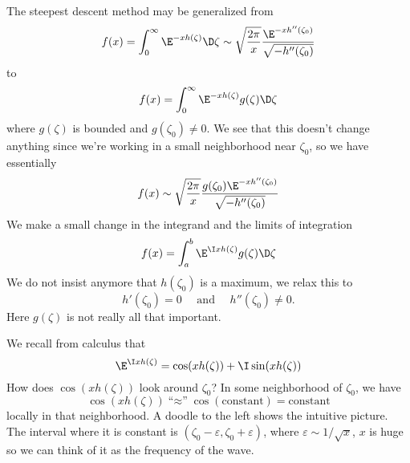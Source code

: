 The steepest descent method may be generalized from
\begin{equation}
f(x)=\int^{\infty}_{0}\E^{-xh(\zeta)}\D\zeta\asymptote\sqrt{\frac{2\pi}{x}}\frac{\E^{-xh''(\zeta_{0})}}{\sqrt{-h''(\zeta_{0})}}
\end{equation}
to 
\begin{equation}
f(x)=\int^{\infty}_{0}\E^{-xh(\zeta)}g(\zeta)\D\zeta
\end{equation}
where $g(\zeta)$ is bounded and $g(\zeta_{0})\not=0$.
We see that this doesn't change anything since we're working in a
small neighborhood near $\zeta_{0}$, so we have essentially
\begin{equation}
f(x)\asymptote\sqrt{\frac{2\pi}{x}}\frac{g(\zeta_{0})\E^{-xh''(\zeta_{0})}}{\sqrt{-h''(\zeta_{0})}}
\end{equation}
We make a small change in the integrand and the limits of
integration
\begin{equation}
f(x)=\int^{b}_{a}\E^{\I xh(\zeta)}g(\zeta)\D\zeta
\end{equation}
We do not insist anymore that $h(\zeta_{0})$ is a maximum, we
relax this to 
\begin{equation}
h'(\zeta_{0})=0\quad\mbox{ and }\quad h''(\zeta_{0})\not=0.
\end{equation}
Here $g(\zeta)$ is not really all that important.

\begin{wrapfigure}{l}{1in}
\vspace{-20pt}
\begin{center}
\end{center}
\end{wrapfigure}
\noindent{}We recall from calculus that
\begin{equation}
\E^{\I xh(\zeta)}=\cos(xh(\zeta))+\I\sin(xh(\zeta))
\end{equation}
How does $\cos(xh(\zeta))$ look around $\zeta_{0}$? In some
neighborhood of $\zeta_{0}$, we have
\begin{equation}
\cos(xh(\zeta))\mbox{``$\approx$''}\cos(\mbox{constant})=\mbox{constant}
\end{equation}
locally in that neighborhood. A doodle to the left shows the
intuitive picture. The interval where it is constant is
$(\zeta_{0}-\varepsilon,\zeta_{0}+\varepsilon)$, where
$\varepsilon\sim1/\sqrt{x}$, $x$ is huge so we can think of it as
the frequency of the wave.

